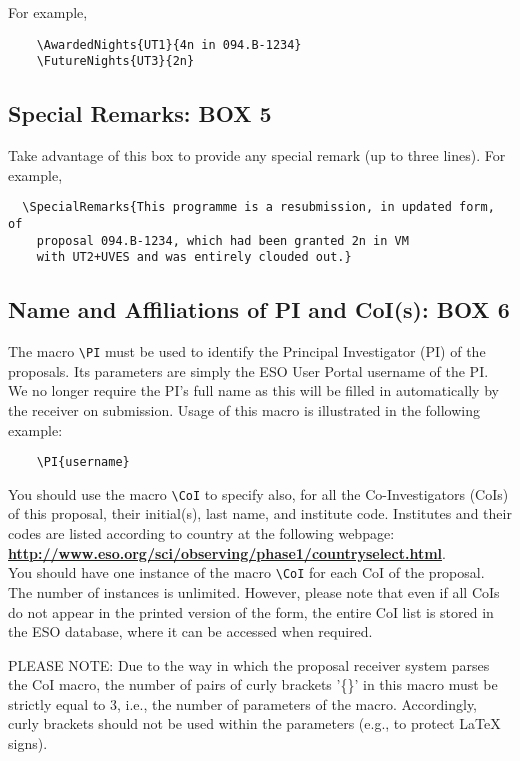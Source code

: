 \documentclass{article}
\begin{document}
For example,
\begin{verbatim}
    \AwardedNights{UT1}{4n in 094.B-1234}
    \FutureNights{UT3}{2n}
\end{verbatim} 

\subsection{Special Remarks:  {\bf BOX 5}}

Take advantage of this box to provide any special remark (up to three
lines).  For example,
\begin{verbatim}
  \SpecialRemarks{This programme is a resubmission, in updated form, of
    proposal 094.B-1234, which had been granted 2n in VM
    with UT2+UVES and was entirely clouded out.}
\end{verbatim}

\subsection{Name and Affiliations of PI and CoI(s): {\bf BOX 6}}


The macro \verb|\PI| must be used to identify the Principal
Investigator (PI) of the proposals. Its parameters are simply the
ESO User Portal username of the PI. We no longer require the PI's full
name as this will be filled in automatically by the receiver on submission.
Usage of this macro is illustrated in the following example:
\begin{verbatim}
    \PI{username}
\end{verbatim}

You should use the macro \verb|\CoI| to specify also, for
all the Co-Investigators (CoIs) of this proposal, their initial(s),
last name, and institute code. Institutes and their codes are listed
according to country at the following webpage:\\
\href{http://www.eso.org/sci/observing/phase1/countryselect.html}
{\bf\underline{http://www.eso.org/sci/observing/phase1/countryselect.html}}.\\
You should have one instance of the macro \verb|\CoI| for each CoI of the
proposal. The number of instances is unlimited. However, please note that
even if all CoIs do not appear in the printed version of the form,
the entire  CoI list is stored in the ESO database, where it
can be accessed when required.

PLEASE NOTE: Due to the way in which the proposal receiver system parses
the CoI macro, the number of pairs of curly brackets '\{\}'
in this macro must be strictly equal to 3, i.e., the
number of parameters of the macro. Accordingly, curly
brackets should not be used within the parameters (e.g.,
to protect LaTeX signs).
\end{document}
